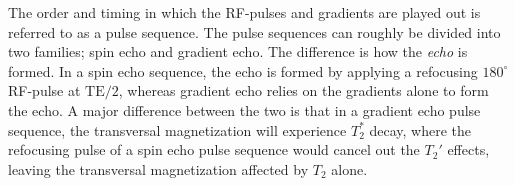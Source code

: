 The order and timing in which the RF-pulses and gradients are played out is referred to as a pulse sequence. The pulse sequences can roughly be divided into two families; spin echo and gradient echo. The difference is how the \emph{echo} is formed. In a spin echo sequence, the echo is formed by applying a refocusing $180^\circ$ RF-pulse at $\textrm{TE}/2$, whereas gradient echo relies on the gradients alone to form the echo. A major difference between the two is that in a gradient echo pulse sequence, the transversal magnetization will experience $T_2^*$ decay, where the refocusing pulse of a spin echo pulse sequence would cancel out the $T_2'$ effects, leaving the transversal magnetization affected by $T_2$ alone.

